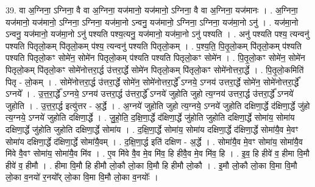 \documentclass[17pt]{extarticle}
\begin{document}
39. वा अ॒ग्निना॒ ऽग्निना॒ वै वा अ॒ग्निना॒ यज॑मानो॒ यज॑मानो॒ ऽग्निना॒ वै वा अ॒ग्निना॒ यज॑मानः । . अ॒ग्निना॒ यज॑मानो॒ यज॑मानो॒ ऽग्निना॒ ऽग्निना॒ यज॑मा॒नो ऽन्वनु॒ यज॑मानो॒ ऽग्निना॒ ऽग्निना॒ यज॑मा॒नो ऽनु॑ । . यज॑मा॒नो ऽन्वनु॒ यज॑मानो॒ यज॑मा॒नो ऽनु॑ पश्यति पश्य॒त्यनु॒ यज॑मानो॒ यज॑मा॒नो ऽनु॑ पश्यति । . अनु॑ पश्यति पश्य॒ त्यन्वनु॑ पश्यति पितृलो॒कम् पि॑तृलो॒कम् प॑श्य॒ त्यन्वनु॑ पश्यति पितृलो॒कम् । . प॒श्य॒ति॒ पि॒तृ॒लो॒कम् पि॑तृलो॒कम् प॑श्यति पश्यति पितृलो॒कꣳ सोमे॑न॒ सोमे॑न पितृलो॒कम् प॑श्यति पश्यति पितृलो॒कꣳ सोमे॑न । . पि॒तृ॒लो॒कꣳ सोमे॑न॒ सोमे॑न पितृलो॒कम् पि॑तृलो॒कꣳ सोमे॑नोत्तरा॒र्द्ध उ॑त्तरा॒र्द्धे सोमे॑न पितृलो॒कम् पि॑तृलो॒कꣳ सोमे॑नोत्तरा॒र्द्धे । . पि॒तृ॒लो॒कमिति॑ पितृ - लो॒कम् । . सोमे॑नोत्तरा॒र्द्ध उ॑त्तरा॒र्द्धे सोमे॑न॒ सोमे॑नोत्तरा॒र्द्धे᳚ ऽग्नये॒ ऽग्नय॑ उत्तरा॒र्द्धे सोमे॑न॒ सोमे॑नोत्तरा॒र्द्धे᳚ ऽग्नये᳚ । . उ॒त्त॒रा॒र्द्धे᳚ ऽग्नये॒ ऽग्नय॑ उत्तरा॒र्द्ध उ॑त्तरा॒र्द्धे᳚ ऽग्नये॑ जुहोति जुहो त्य॒ग्नय॑ उत्तरा॒र्द्ध उ॑त्तरा॒र्द्धे᳚ ऽग्नये॑ जुहोति । . उ॒त्त॒रा॒र्द्ध इत्यु॑त्तर - अ॒र्द्धे । . अ॒ग्नये॑ जुहोति जुहो त्य॒ग्नये॒ ऽग्नये॑ जुहोति दक्षिणा॒र्द्धे द॑क्षिणा॒र्द्धे जु॑हो त्य॒ग्नये॒ ऽग्नये॑ जुहोति दक्षिणा॒र्द्धे । . जु॒हो॒ति॒ द॒क्षि॒णा॒र्द्धे द॑क्षिणा॒र्द्धे जु॑होति जुहोति दक्षिणा॒र्द्धे सोमा॑य॒ सोमा॑य दक्षिणा॒र्द्धे जु॑होति जुहोति दक्षिणा॒र्द्धे सोमा॑य । . द॒क्षि॒णा॒र्द्धे सोमा॑य॒ सोमा॑य दक्षिणा॒र्द्धे द॑क्षिणा॒र्द्धे सोमा॑यै॒व मे॒वꣳ सोमा॑य दक्षिणा॒र्द्धे द॑क्षिणा॒र्द्धे सोमा॑यै॒वम् । . द॒क्षि॒णा॒र्द्ध इति॑ दक्षिण - अ॒र्द्धे । . सोमा॑यै॒व मे॒वꣳ सोमा॑य॒ सोमा॑यै॒व मि॑वे वै॒वꣳ सोमा॑य॒ सोमा॑यै॒व मि॑व । . ए॒व मि॑वे वै॒व मे॒व मि॑व॒ हि हीवै॒व मे॒व मि॑व॒ हि । . इ॒व॒ हि हीवे॑ व॒ हीमा वि॒मौ हीवे॑ व॒ हीमौ । . हीमा वि॒मौ हि हीमौ लो॒कौ लो॒का वि॒मौ हि हीमौ लो॒कौ । . इ॒मौ लो॒कौ लो॒का वि॒मा वि॒मौ लो॒का व॒नयो॑ र॒नयो᳚र् लो॒का वि॒मा वि॒मौ लो॒का व॒नयोः᳚ । \newline
\end{document}
